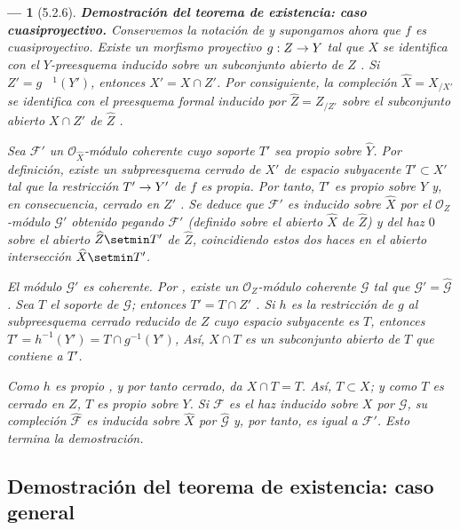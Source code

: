 \documentclass[10pt,oneside,openany]{book}
\theoremstyle{egaenv}\newtheorem*{env}{---}
\theoremstyle{egastatement}
\theoremstyle{egadescription}
\newcommand{\oldpage}[2][]{\marginnote{\normalfont\scriptsize\textbf{#1}\,|\,#2}\ignorespaces}
\renewcommand{\to}{\mathchoice{\longrightarrow}{\rightarrow}{\rightarrow}{\rightarrow}}
\begin{document}
\begin{env}[5.2.6]
\label{III.5.2.6}
\label{III.5.2.6-fr}
\textbf{Demostración del teorema de existencia: caso cuasiproyectivo.}
Conservemos la notación de  y supongamos ahora que $f$
es \emph{cuasiproyectivo}. Existe un morfismo proyectivo
$g:Z\to Y$ tal que $X$ se identifica con el $Y$-preesquema
inducido sobre un subconjunto abierto de $Z$ . Si
$Z'=g^{\phantom{-}1}(Y')$, entonces $X'=X\cap Z'$. Por consiguiente, la compleción
$\widehat X=X_{/X'}$ se identifica con el preesquema formal
inducido por $\widehat Z=Z_{/Z'}$ sobre el subconjunto abierto $X\cap Z'$ de
$\widehat Z$ .

Sea $\mathcal F'$ un $\mathcal O_{\widehat X}$-módulo coherente cuyo
soporte $T'$ sea \emph{propio sobre} $\widehat Y$. Por definición, existe
un subpreesquema cerrado de $X'$ de espacio subyacente
$T'\subset X'$ tal que la restricción $T'\to Y'$ de $f$ es
propia. Por tanto, $T'$ es propio \emph{sobre} $Y$ y, en consecuencia, \emph{cerrado en}
$Z'$ . Se deduce que $\mathcal F'$ es inducido
sobre $\widehat X$ por el $\mathcal O_Z$-módulo $\mathcal G'$
obtenido pegando $\mathcal F'$ (definido sobre el abierto $\widehat X$ de $\widehat Z$) y
del haz $0$ sobre el abierto $\widehat Z\setmin T'$ de $\widehat Z$, coincidiendo estos dos haces
en el abierto intersección $\widehat X\setmin T'$.

El módulo $\mathcal G'$ es coherente. Por , existe un
$\mathcal O_Z$-módulo coherente $\mathcal G$ tal que
$\mathcal G'=\widehat{\mathcal G}$. Sea $T$ el soporte de $\mathcal G$;
entonces $T'=T\cap Z'$ . Si $h$ es la restricción
de $g$ al subpreesquema cerrado reducido de $Z$ cuyo espacio subyacente
es $T$, entonces
$T'=h^{-1}(Y')=T\cap g^{-1}(Y')$,
Así, $X\cap T$ es un subconjunto abierto de $T$ que contiene a $T'$.

\oldpage[III]{154}
Como $h$ es propio , y por tanto cerrado,
 da $X\cap T=T$. Así, $T\subset X$; y
como $T$ es cerrado en $Z$, $T$ es propio sobre $Y$. Si $\mathcal F$ es
el haz inducido sobre $X$ por $\mathcal G$, su compleción
$\widehat{\mathcal F}$ es inducida sobre $\widehat X$ por
$\widehat{\mathcal G}$  y, por tanto, es igual a
$\mathcal F'$. Esto termina la demostración.
\end{env}


\subsection{Demostración del teorema de existencia: caso general}
\label{subsection:III.5.3}
\label{subsection:III.5.3-fr}
\end{document}
